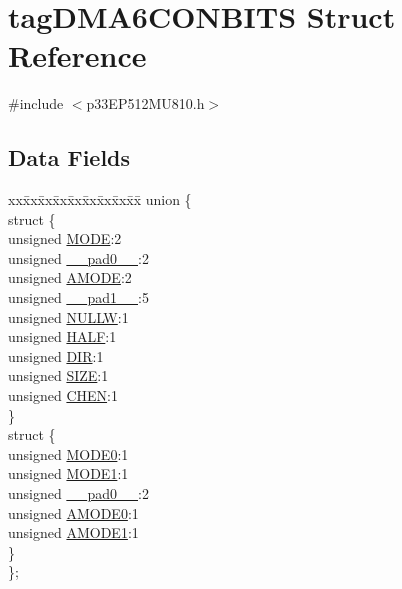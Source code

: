 \hypertarget{structtag_d_m_a6_c_o_n_b_i_t_s}{}\section{tag\+D\+M\+A6\+C\+O\+N\+B\+I\+TS Struct Reference}
\label{structtag_d_m_a6_c_o_n_b_i_t_s}


{\ttfamily \#include $<$p33\+E\+P512\+M\+U810.\+h$>$}

\subsection*{Data Fields}
\begin{DoxyCompactItemize}
\item 
\begin{tabbing}
xx\=xx\=xx\=xx\=xx\=xx\=xx\=xx\=xx\=\kill
union \{\\
\>struct \{\\
\>\>unsigned \hyperlink{structtag_d_m_a6_c_o_n_b_i_t_s_adc56ba18ff3f1599c85d222bee624424}{MODE}:2\\
\>\>unsigned \hyperlink{structtag_d_m_a6_c_o_n_b_i_t_s_adf71f3d8410c1f1dbbc96680a92c49af}{\_\_pad0\_\_}:2\\
\>\>unsigned \hyperlink{structtag_d_m_a6_c_o_n_b_i_t_s_ab3ff4e1f1b9a1037418ca7b6cb2e8f77}{AMODE}:2\\
\>\>unsigned \hyperlink{structtag_d_m_a6_c_o_n_b_i_t_s_acaf2d0924a107ec6e8d2e31febaf66f9}{\_\_pad1\_\_}:5\\
\>\>unsigned \hyperlink{structtag_d_m_a6_c_o_n_b_i_t_s_a1d3f7d04416314131889d1671a9287ad}{NULLW}:1\\
\>\>unsigned \hyperlink{structtag_d_m_a6_c_o_n_b_i_t_s_a1a715a64b2576f59401ac93d6f9a086a}{HALF}:1\\
\>\>unsigned \hyperlink{structtag_d_m_a6_c_o_n_b_i_t_s_ad6868749602045a76f36ffdf964dfd39}{DIR}:1\\
\>\>unsigned \hyperlink{structtag_d_m_a6_c_o_n_b_i_t_s_a5863cac6dc2cb330bdd0b1c66da70ffe}{SIZE}:1\\
\>\>unsigned \hyperlink{structtag_d_m_a6_c_o_n_b_i_t_s_a092934036fdfb8df5259db288fe438ca}{CHEN}:1\\
\>\} \\
\>struct \{\\
\>\>unsigned \hyperlink{structtag_d_m_a6_c_o_n_b_i_t_s_abc938903e74bff48935569d0c5b19035}{MODE0}:1\\
\>\>unsigned \hyperlink{structtag_d_m_a6_c_o_n_b_i_t_s_a7a9f7514566d0626724ce6c4b81b5ea2}{MODE1}:1\\
\>\>unsigned \hyperlink{structtag_d_m_a6_c_o_n_b_i_t_s_adf71f3d8410c1f1dbbc96680a92c49af}{\_\_pad0\_\_}:2\\
\>\>unsigned \hyperlink{structtag_d_m_a6_c_o_n_b_i_t_s_a0a1f894a2695c1388a5412244636805b}{AMODE0}:1\\
\>\>unsigned \hyperlink{structtag_d_m_a6_c_o_n_b_i_t_s_a3fde4abc0dc3db6fef6afc28c565ce3e}{AMODE1}:1\\
\>\} \\
\}; \\


\end{tabbing}
\end{DoxyCompactItemize}
